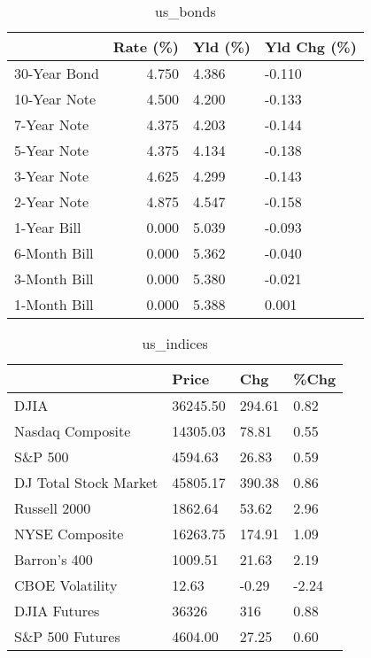 \documentclass{article}%
\begin{document}
%


\begin{table}[htbp]%
\caption{us\_bonds}%
\centering%
\begin{adjustbox}{width=1\textwidth}%
\begin{tabular}{lrll}
\toprule
             &  Rate (\%) & Yld (\%) & Yld Chg (\%) \\
\midrule
30-Year Bond &     4.750 &   4.386 &      -0.110 \\
10-Year Note &     4.500 &   4.200 &      -0.133 \\
 7-Year Note &     4.375 &   4.203 &      -0.144 \\
 5-Year Note &     4.375 &   4.134 &      -0.138 \\
 3-Year Note &     4.625 &   4.299 &      -0.143 \\
 2-Year Note &     4.875 &   4.547 &      -0.158 \\
 1-Year Bill &     0.000 &   5.039 &      -0.093 \\
6-Month Bill &     0.000 &   5.362 &      -0.040 \\
3-Month Bill &     0.000 &   5.380 &      -0.021 \\
1-Month Bill &     0.000 &   5.388 &       0.001 \\
\bottomrule
\end{tabular}
%
\end{adjustbox}%
\end{table}

%


\begin{table}[htbp]%
\caption{us\_indices}%
\centering%
\begin{adjustbox}{width=1\textwidth}%
\begin{tabular}{llll}
\toprule
                      &    Price &    Chg &  \%Chg \\
\midrule
                 DJIA & 36245.50 & 294.61 &  0.82 \\
     Nasdaq Composite & 14305.03 &  78.81 &  0.55 \\
              S\&P 500 &  4594.63 &  26.83 &  0.59 \\
DJ Total Stock Market & 45805.17 & 390.38 &  0.86 \\
         Russell 2000 &  1862.64 &  53.62 &  2.96 \\
       NYSE Composite & 16263.75 & 174.91 &  1.09 \\
         Barron's 400 &  1009.51 &  21.63 &  2.19 \\
      CBOE Volatility &    12.63 &  -0.29 & -2.24 \\
         DJIA Futures &    36326 &    316 &  0.88 \\
      S\&P 500 Futures &  4604.00 &  27.25 &  0.60 \\
\bottomrule
\end{tabular}
%
\end{adjustbox}%
\end{table}
\end{document}
